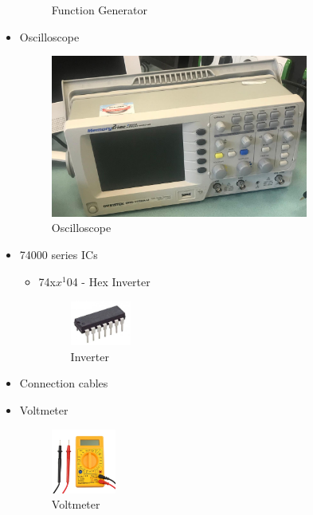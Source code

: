 \documentclass[pdftex,12pt,a4paper]{article}
\begin{document}
\begin{itemize}
\begin{figure}[ht]
    	\caption{Function Generator}
    	\label{fig6}
        \end{figure}
    \newpage
    \item Oscilloscope
        \begin{figure}[H]
        	\centering
        	\includegraphics[width=0.8\textwidth]{osc.jpeg}	
        	\caption{Oscilloscope}
        	\label{fig7}
            \end{figure}
    \item 74000 series ICs
    \begin{itemize}
        \item 74x$x^{1}$04 - Hex Inverter
            \begin{figure}[ht]
        	\centering
        	\includegraphics[width=0.2\textwidth]{7404.JPEG}
        	\caption{Inverter}
        	\label{fig8}
            \end{figure}
    \end{itemize}
    \item Connection cables
    \item Voltmeter
    
     \begin{figure}[ht]
        	\centering
        	\includegraphics[width=0.2\textwidth]{voltmeter.jpg}
        	\caption{Voltmeter}
        	\label{fig9}
            \end{figure}
\end{itemize}
\end{document}
